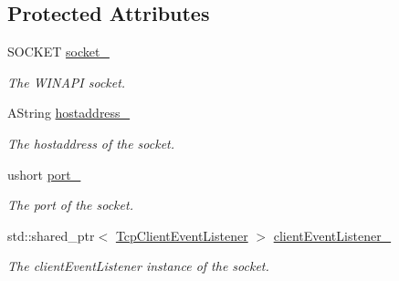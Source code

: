 \subsection*{Protected Attributes}
\begin{DoxyCompactItemize}
\item 
\mbox{\label{class_tcp_socket_aa51cfa63d5c44f1f633c4f2e5f96dbbd}} 
S\+O\+C\+K\+ET \mbox{\hyperlink{class_tcp_socket_aa51cfa63d5c44f1f633c4f2e5f96dbbd}{socket\+\_\+}}
\begin{DoxyCompactList}\small\item\em The W\+I\+N\+A\+PI socket. \end{DoxyCompactList}\item 
\mbox{\label{class_tcp_socket_ac60988983660746eacf7882c1bfa6418}} 
A\+String \mbox{\hyperlink{class_tcp_socket_ac60988983660746eacf7882c1bfa6418}{hostaddress\+\_\+}}
\begin{DoxyCompactList}\small\item\em The hostaddress of the socket. \end{DoxyCompactList}\item 
\mbox{\label{class_tcp_socket_a86ac6f9715df1dead41f01a9c02b91c8}} 
ushort \mbox{\hyperlink{class_tcp_socket_a86ac6f9715df1dead41f01a9c02b91c8}{port\+\_\+}}
\begin{DoxyCompactList}\small\item\em The port of the socket. \end{DoxyCompactList}\item 
\mbox{\label{class_tcp_socket_ac4f8715bc5a1b8f50d04a29c7baa7987}} 
std\+::shared\+\_\+ptr$<$ \mbox{\hyperlink{class_tcp_client_event_listener}{Tcp\+Client\+Event\+Listener}} $>$ \mbox{\hyperlink{class_tcp_socket_ac4f8715bc5a1b8f50d04a29c7baa7987}{client\+Event\+Listener\+\_\+}}
\begin{DoxyCompactList}\small\item\em The client\+Event\+Listener instance of the socket. \end{DoxyCompactList}\end{DoxyCompactItemize}
